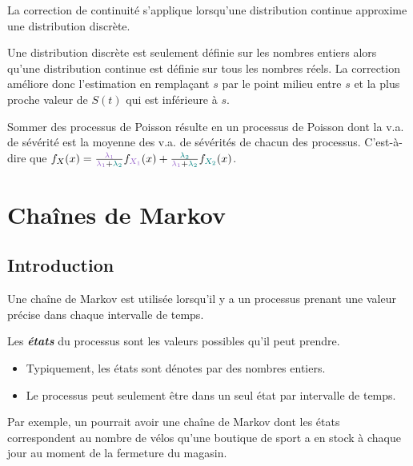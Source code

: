 \documentclass[french]{article}
\begin{document}
\begin{multicols*}{2}
\begin{definitionNOHFILLpropos}
La correction de continuité s'applique lorsqu'une distribution continue approxime une distribution discrète.

\bigskip

Une distribution discrète est seulement définie sur les nombres entiers alors qu'une distribution continue est définie sur tous les nombres réels. La correction améliore donc l'estimation en remplaçant $s$ par le point milieu entre $s$ et la plus proche valeur de $S(t)$ qui est inférieure à $s$.
\end{definitionNOHFILLpropos}

Sommer des processus de Poisson résulte en un processus de Poisson dont la v.a. de sévérité est la moyenne des v.a. de sévérités de chacun des processus. C'est-à-dire que $f_{X}(x) = \frac{\textcolor{amethyst}{\lambda_{1}}}{\textcolor{amethyst}{\lambda_{1}} + \textcolor{teal}{\lambda_{2}}} f_{\textcolor{amethyst}{X_{1}}}(x) + \frac{\textcolor{teal}{\lambda_{2}}}{\textcolor{amethyst}{\lambda_{1}} + \textcolor{teal}{\lambda_{2}}} f_{\textcolor{teal}{X_{2}}}(x)$.



\pagebreak
\section{Chaînes de Markov}
\subsection{Introduction}
\begin{rappel_enhanced}[Contexte]
Une chaîne de Markov est utilisée lorsqu'il y a un processus prenant une valeur précise dans chaque intervalle de temps.

\bigskip

Les \textbf{\textit{états}} du processus sont les valeurs possibles qu'il peut prendre.
\begin{itemize}
	\item	Typiquement, les états sont dénotes par des nombres entiers.
	\item	Le processus peut seulement être dans un seul état par intervalle de temps.
\end{itemize}

Par exemple, un pourrait avoir une chaîne de Markov dont les états correspondent au nombre de vélos qu'une boutique de sport a en stock à chaque jour au moment de la fermeture du magasin.	


\end{rappel_enhanced}
\end{multicols*}
\end{document}
